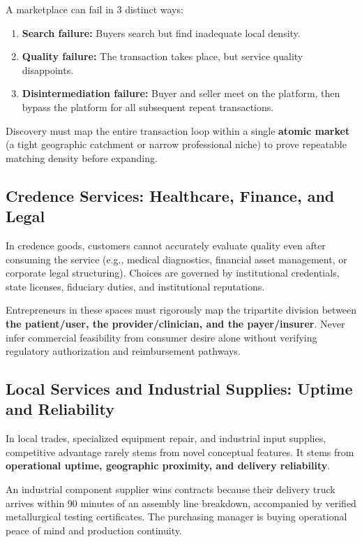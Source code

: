 A marketplace can fail in 3 distinct ways:
\begin{enumerate}[leftmargin=1.2em,itemsep=0.2ex]
  \item \textbf{Search failure:} Buyers search but find inadequate local density.
  \item \textbf{Quality failure:} The transaction takes place, but service quality disappoints.
  \item \textbf{Disintermediation failure:} Buyer and seller meet on the platform, then bypass the platform for all subsequent repeat transactions.
\end{enumerate}
Discovery must map the entire transaction loop within a single \textbf{atomic market} (a tight geographic catchment or narrow professional niche) to prove repeatable matching density before expanding.

\subsection{Credence Services: Healthcare, Finance, and Legal}

In credence goods, customers cannot accurately evaluate quality even after consuming the service (e.g., medical diagnostics, financial asset management, or corporate legal structuring). Choices are governed by institutional credentials, state licenses, fiduciary duties, and institutional reputations.

Entrepreneurs in these spaces must rigorously map the tripartite division between \textbf{the patient/user, the provider/clinician, and the payer/insurer}. Never infer commercial feasibility from consumer desire alone without verifying regulatory authorization and reimbursement pathways.

\subsection{Local Services and Industrial Supplies: Uptime and Reliability}

In local trades, specialized equipment repair, and industrial input supplies, competitive advantage rarely stems from novel conceptual features. It stems from \textbf{operational uptime, geographic proximity, and delivery reliability}.

An industrial component supplier wins contracts because their delivery truck arrives within 90 minutes of an assembly line breakdown, accompanied by verified metallurgical testing certificates. The purchasing manager is buying operational peace of mind and production continuity.

